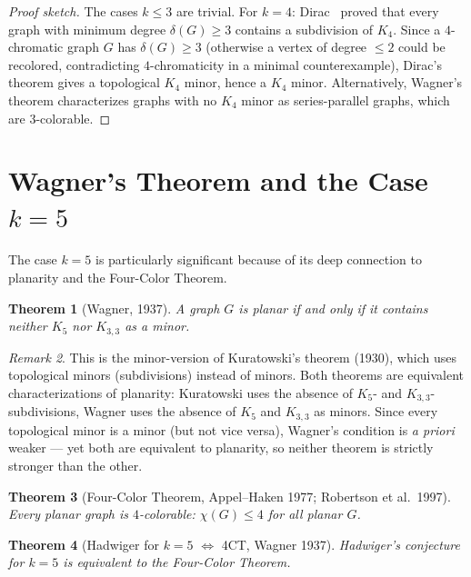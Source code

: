 \documentclass[12pt,a4paper]{amsart}
\newtheorem{theorem}{Theorem}[section]
\theoremstyle{definition}
\theoremstyle{remark}
\newtheorem{remark}[theorem]{Remark}
\begin{document}
\begin{proof}[Proof sketch]
The cases $k \leq 3$ are trivial. For $k = 4$: Dirac~\cite{Dirac52} proved
that every graph with minimum degree $\delta(G) \geq 3$ contains a subdivision
of $K_4$. Since a $4$-chromatic graph $G$ has $\delta(G) \geq 3$ (otherwise
a vertex of degree $\leq 2$ could be recolored, contradicting $4$-chromaticity
in a minimal counterexample), Dirac's theorem gives a topological $K_4$ minor,
hence a $K_4$ minor. Alternatively, Wagner's theorem characterizes graphs
with no $K_4$ minor as series-parallel graphs, which are $3$-colorable.
\end{proof}

\section{Wagner's Theorem and the Case \texorpdfstring{$k = 5$}{k=5}}

The case $k = 5$ is particularly significant because of its deep connection to
planarity and the Four-Color Theorem.

\begin{theorem}[Wagner, 1937]\label{thm:wagner}
A graph $G$ is planar if and only if it contains neither $K_5$ nor $K_{3,3}$
as a minor.
\end{theorem}

\begin{remark}
This is the minor-version of Kuratowski's theorem (1930), which uses topological
minors (subdivisions) instead of minors. Both theorems are equivalent
characterizations of planarity: Kuratowski uses the absence of $K_5$- and
$K_{3,3}$-subdivisions, Wagner uses the absence of $K_5$ and $K_{3,3}$ as
minors. Since every topological minor is a minor (but not vice versa),
Wagner's condition is \emph{a priori} weaker — yet both are equivalent
to planarity, so neither theorem is strictly stronger than the other.
\end{remark}

\begin{theorem}[Four-Color Theorem, Appel--Haken 1977; Robertson et al.\ 1997]\label{thm:4CT}
Every planar graph is $4$-colorable: $\chi(G) \leq 4$ for all planar $G$.
\end{theorem}

\begin{theorem}[Hadwiger for $k = 5$ $\Leftrightarrow$ 4CT, Wagner 1937]\label{thm:k5}
Hadwiger's conjecture for $k = 5$ is equivalent to the Four-Color Theorem.
\end{theorem}
\end{document}
